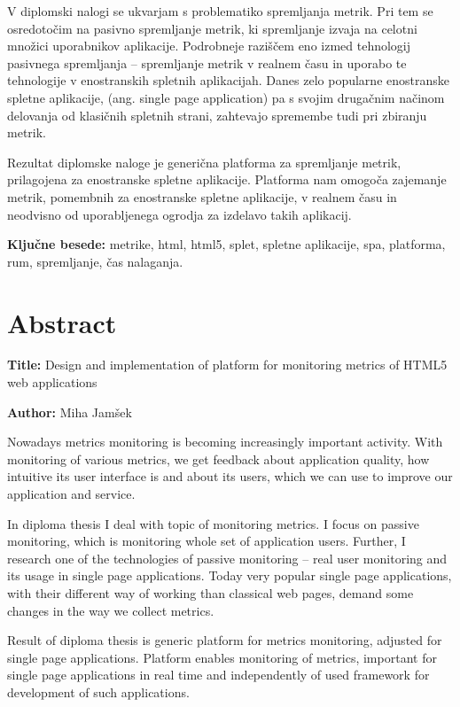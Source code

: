 \documentclass[a4paper, 12pt]{book}
\newcommand{\ttitleEn}{Design and implementation of platform for monitoring metrics of HTML5 web applications}
\newcommand{\tauthor}{Miha Jamšek}
\newcommand{\tkeywords}{metrike, html, html5, splet, spletne aplikacije, spa, platforma, rum, spremljanje, čas nalaganja}
\newcommand{\clearemptydoublepage}{\newpage{\pagestyle{empty}\cleardoublepage}}
\begin{document}
V diplomski nalogi se ukvarjam s problematiko spremljanja metrik. Pri tem se osredotočim na pasivno spremljanje metrik, ki spremljanje izvaja na celotni množici uporabnikov aplikacije. Podrobneje raziščem eno izmed tehnologij pasivnega spremljanja – spremljanje metrik v realnem času in uporabo te tehnologije v enostranskih spletnih aplikacijah. Danes zelo popularne enostranske spletne aplikacije, (ang. single page application) pa s svojim drugačnim načinom delovanja od klasičnih spletnih strani, zahtevajo spremembe tudi pri zbiranju metrik.

Rezultat diplomske naloge je generična platforma za spremljanje metrik, prilagojena za enostranske spletne aplikacije. Platforma nam omogoča zajemanje metrik, pomembnih za enostranske spletne aplikacije, v realnem času in neodvisno od uporabljenega ogrodja za izdelavo takih aplikacij.

\bigskip

\noindent\textbf{Ključne besede:} \tkeywords.
\clearemptydoublepage

\chapter*{Abstract}

\noindent\textbf{Title:} \ttitleEn
\bigskip

\noindent\textbf{Author:} \tauthor
\bigskip

\noindent
Nowadays metrics monitoring is becoming increasingly important activity. With monitoring of various metrics, we get feedback about application quality, how intuitive its user interface is and about its users, which we can use to improve our application and service.

In diploma thesis I deal with topic of monitoring metrics. I focus on passive monitoring, which is monitoring whole set of application users. Further, I research one of the technologies of passive monitoring – real user monitoring and its usage in single page applications. Today very popular single page applications, with their different way of working than classical web pages, demand some changes in the way we collect metrics.

Result of diploma thesis is generic platform for metrics monitoring, adjusted for single page applications. Platform enables monitoring of metrics, important for single page applications in real time and independently of used framework for development of such applications.
\end{document}
